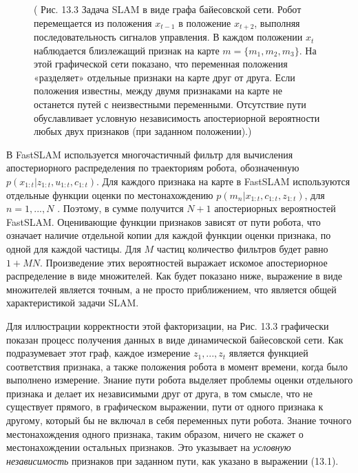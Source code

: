 \documentclass[10pt,a4paper]{article}
\begin{document}
\begin{figure}[H]
	\caption{ ( Рис. 13.3 Задача SLAM в виде графа байесовской сети. Робот перемещается из положения $x_{t-1}$ в положение $x_{t+2}$, выполняя последовательность сигналов управления. В каждом положении $x_t$ наблюдается близлежащий признак на карте $m=\{m_1,m_2,m_3\}$. На этой графической сети показано, что переменная положения «разделяет» отдельные признаки на карте друг от друга. Если положения известны, между двумя признаками на карте не останется путей с неизвестными переменными. Отсутствие пути обуславливает условную независимость апостериорной вероятности любых двух признаков (при заданном положении).) }
	\label{fig:133orig}
\end{figure}

В FastSLAM используется многочастичный фильтр для вычисления апостериорного распределения по траекториям робота, обозначенную  $p(x_{1:t}| z_{1:t}, u_{1:t}, c_{1:t})$. Для каждого признака на карте в FastSLAM используются отдельные функции оценки по местонахождению $p(m_n|x_{1:t}, c_{1:t}, z_{1:t})$, для $n = 1,...,N$ . Поэтому, в сумме получится $N+1$ апостериорных вероятностей FastSLAM. Оценивающие функции признаков зависят от пути робота, что означает наличие отдельной копии для каждой функции оценки признака, по одной для каждой частицы. Для $M$ частиц количество фильтров будет равно $1+MN$. Произведение этих вероятностей выражает искомое апостериорное распределение в виде множителей. Как будет показано ниже, выражение в виде множителей является точным, а не просто приближением, что является общей характеристикой задачи SLAM.

Для иллюстрации корректности этой факторизации, на Рис. 13.3 графически показан процесс получения данных в виде динамической байесовской сети. Как подразумевает этот граф, каждое измерение $z_1,..., z_t$ является функцией соответствия признака, а также положения робота в момент времени, когда было выполнено измерение. Знание пути робота выделяет проблемы оценки отдельного признака и делает их независимыми друг от друга, в том смысле, что не существует прямого, в графическом выражении, пути от одного признака к другому, который бы не включал в себя переменных пути робота. Знание точного местонахождения одного признака, таким образом, ничего не скажет о местонахождении остальных признаков. Это указывает на \textit{условную независимость} признаков при заданном пути, как указано в выражении (13.1).
\end{document}
